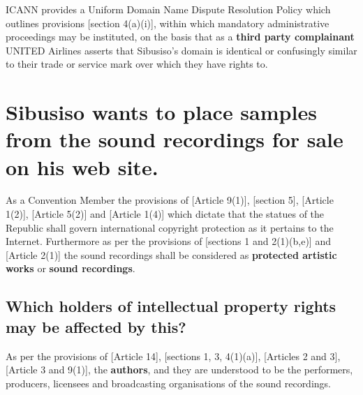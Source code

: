 \documentclass[11pt]{article}
\begin{document}
ICANN provides a Uniform Domain Name Dispute Resolution Policy which outlines
provisions [section 4(a)(i)]\cite{icann99_policy}, within which mandatory
administrative proceedings may be instituted, on the basis that as a \textbf{third
party complainant} UNITED Airlines asserts that Sibusiso's domain is identical
or confusingly similar to their trade or service mark over which they have
rights to.

\section{Sibusiso wants to place samples from the sound recordings for sale on his web site.}
\label{sec:org6b4d04c}
As a Convention Member the provisions of [Article 9(1)]\cite{wto17_trips},
[section 5]\cite{rsa78_copyrightact}, [Article 1(2)]\cite{eurlex00_elec_commerce},
[Article 5(2)]\cite{wipo86_berne} and [Article 1(4)]\cite{wipo96_copyright_treaty}
which dictate that the statues of the Republic shall govern international
copyright protection as it pertains to the Internet. Furthermore as per the
provisions of [sections 1 and 2(1)(b,e)]\cite{rsa78_copyrightact} and [Article
2(1)]\cite{wipo86_berne} the sound recordings shall be considered as \textbf{protected
artistic works} or \textbf{sound recordings}.

\subsection{Which holders of intellectual property rights may be affected by this?}
\label{sec:orgcf47608}

As per the provisions of [Article 14]\cite{wto17_trips}, [sections 1, 3,
4(1)(a)]\cite{rsa78_copyrightact}, [Articles 2 and 3]\cite{wipo96_wppt}, [Article 3
and 9(1)]\cite{wipo86_berne}, the \textbf{authors}, and they are understood to be the
performers, producers, licensees and broadcasting organisations of the sound
recordings.
\end{document}
